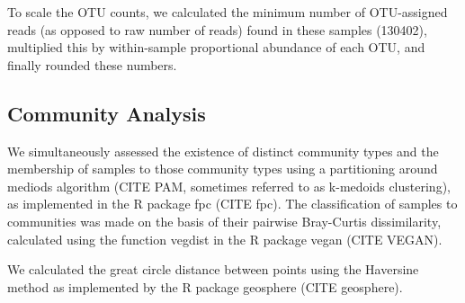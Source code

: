 \documentclass[11pt,letterpaper]{article} %
\begin{document}
%
%
%
%
%
%
%


To scale the OTU counts, we calculated the minimum number of OTU-assigned reads (as opposed to raw number of reads) found in these samples (130402), multiplied this by within-sample proportional abundance of each OTU, and finally rounded these numbers.




\subsection*{Community Analysis}
We simultaneously assessed the existence of distinct community types and the membership of samples to those community types using a partitioning around mediods algorithm (CITE PAM, sometimes referred to as k-medoids clustering), as implemented in the R package fpc (CITE fpc).
The classification of samples to communities was made on the basis of their pairwise Bray-Curtis dissimilarity, calculated using the function vegdist in the R package vegan (CITE VEGAN). %

We calculated the great circle distance between points using the Haversine method as implemented by the R package geosphere (CITE geosphere).
\end{document}
